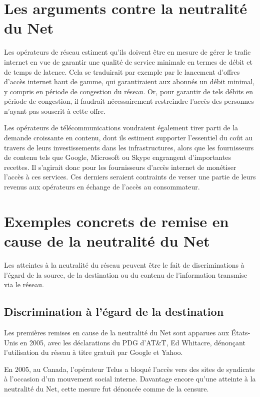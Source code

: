 \documentclass[a4paper,11pt,sf]{leaflet}
\begin{document}
\section{Les arguments contre la neutralité du Net}

Les opérateurs de réseau estiment qu'ils doivent être en mesure de gérer
le trafic internet en vue de garantir une qualité de service minimale en
termes de débit et de temps de latence. Cela se traduirait par exemple
par le lancement d'offres d'accès internet \og{}haut de gamme\fg{}, qui
garantiraient aux abonnés un débit minimal, y compris en période de
congestion du réseau. Or, pour garantir de tels débits en période de
congestion, il faudrait nécessairement restreindre l'accès des personnes
n'ayant pas souscrit à cette offre.

Les opérateurs de télécommunications voudraient également tirer parti de
la demande croissante en contenu, dont ils estiment supporter
l'essentiel du coût au travers de leurs investissements dans les
infrastructures, alors que les fournisseurs de contenu tels que Google,
Microsoft ou Skype engrangent d'importantes recettes. Il s'agirait donc
pour les fournisseurs d'accès internet de monétiser l'accès à ces
services. Ces derniers seraient contraints de verser une partie de leurs
revenus aux opérateurs en échange de l'accès au consommateur.

\section{Exemples concrets de remise en cause de la neutralité du Net}

Les atteintes à la neutralité du réseau peuvent être le fait de
discriminations à l'égard de la source, de la destination ou du contenu
de l'information transmise via le réseau.

\subsection{Discrimination à l'égard de la
destination}\label{discrimination-uxe0-luxe9gard-de-la-destination}

Les premières remises en cause de la neutralité du Net sont apparues aux
États-Unis en 2005, avec les déclarations du PDG d'AT\&T, Ed Whitacre,
dénonçant l'utilisation du réseau à titre gratuit par Google et Yahoo.

En 2005, au Canada, l'opérateur Telus a bloqué l'accès vers des sites de
syndicats à l'occasion d'un mouvement social interne. Davantage encore
qu'une atteinte à la neutralité du Net, cette mesure fut dénoncée comme
de la censure.
\end{document}
